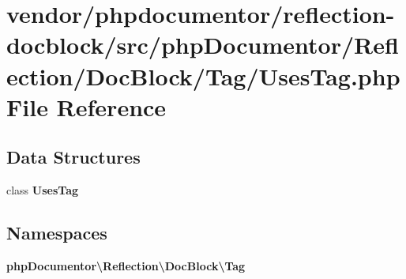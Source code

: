 \section{vendor/phpdocumentor/reflection-\/docblock/src/php\+Documentor/\+Reflection/\+Doc\+Block/\+Tag/\+Uses\+Tag.php File Reference}
\label{_uses_tag_8php}
\subsection*{Data Structures}
\begin{DoxyCompactItemize}
\item 
class {\bf Uses\+Tag}
\end{DoxyCompactItemize}
\subsection*{Namespaces}
\begin{DoxyCompactItemize}
\item 
 {\bf php\+Documentor\textbackslash{}\+Reflection\textbackslash{}\+Doc\+Block\textbackslash{}\+Tag}
\end{DoxyCompactItemize}
